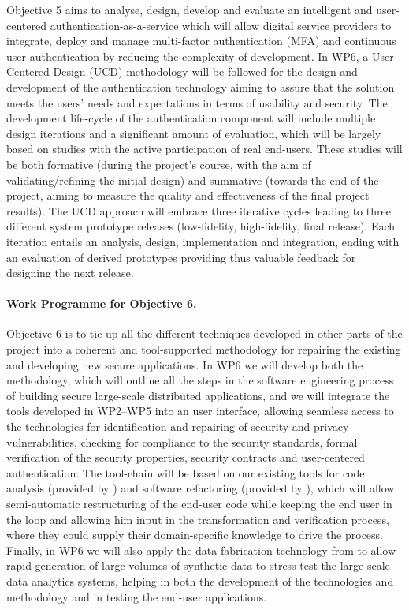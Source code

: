 \documentclass[a4paper,11pt]{article}
\begin{document}
Objective 5 aims to analyse, design, develop and evaluate an intelligent and user-centered authentication-as-a-service which will allow digital service providers to integrate, deploy and manage multi-factor authentication (MFA) and continuous user authentication by reducing the complexity of development. In WP6, a User-Centered Design (UCD) methodology will be followed for the design and development of the authentication technology aiming to assure that the solution meets the users' needs and expectations in terms of usability and security. The development life-cycle of the authentication component will include multiple design iterations and a significant amount of evaluation, which will be largely based on studies with the active participation of real end-users. These studies will be both formative (during the project’s course, with the aim of validating/refining the initial design) and summative (towards the end of the project, aiming to measure the quality and effectiveness of the final project results). The UCD approach will embrace three iterative cycles leading to three different system prototype releases (low-fidelity, high-fidelity, final release). Each iteration entails an analysis, design, implementation and integration, ending with an evaluation of derived prototypes providing thus valuable feedback for designing the next release. 

\paragraph{Work Programme for Objective 6.} 

Objective 6 is to tie up all the different techniques developed in other parts of the project into a coherent and tool-supported methodology for repairing the existing and developing new secure applications. In WP6 we will develop both the methodology, which will outline all the steps in the software engineering process of building secure large-scale distributed applications, and we will integrate the tools developed in WP2--WP5 into an user interface, allowing seamless access to the technologies for identification and repairing of security and privacy vulnerabilities, checking for compliance to the security standards, formal verification of the security properties, security contracts and user-centered authentication. The tool-chain will be based on our existing tools for code analysis (provided by \YAGshort{}) and software refactoring (provided by \SAshort{}), which will allow semi-automatic restructuring of the end-user code while keeping the end user in the loop and allowing him input in the transformation and verification process, where they could supply their domain-specific knowledge to drive the process. Finally, in WP6 we will also apply the data fabrication technology from \IBMshort{} to allow rapid generation of large volumes of synthetic data to stress-test the large-scale data analytics systems, helping in both the development of the technologies and methodology and in testing the end-user applications.
\end{document}
